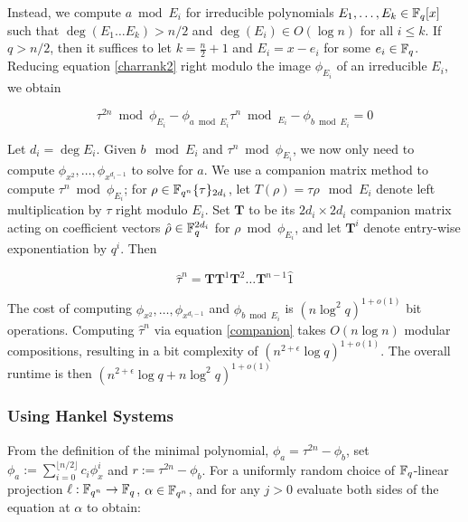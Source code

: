 Instead, we compute $a \bmod E_i$ for irreducible polynomials $E_1, \ldots, E_k \in \mathbb{F}_q[x]$ such that $\deg(E_1 \ldots E_k) > n/2$ and $\deg(E_i) \in O(\log n)$ for all $i \leq k$. If $q > n/2$, then it suffices to let $k = \frac{n}{2} + 1$ and $E_i = x - e_i$ for some $e_i \in \mathbb{F}_q$. Reducing equation \ref{charrank2} right modulo the image $\phi_{E_i}$ of an irreducible $E_i$, we obtain

\begin{equation}\label{modchar}
    \tau^{2n} \bmod \phi_{E_i} - \phi_{a \bmod E_i}\tau^n \bmod_{E_i} - \phi_{b \bmod E_i} = 0
\end{equation}

Let $d_i = \deg E_i$. Given $b \mod E_i$ and $\tau^n \bmod \phi_{E_i}$, we now only need to compute $\phi_{x^2}, \ldots, \phi_{x^{d_i -1}}$ to solve for $a$.  We use a companion matrix method to compute $\tau^n \bmod \phi_{E_i}$; for $\rho \in \mathbb{F}_{q^n}\{\tau\}_{2d_i}$, let $T(\rho) = \tau \rho \mod E_i$ denote left multiplication by $\tau$ right modulo $E_i$. Set $\mathbf{T}$ to be its $2d_i \times 2d_i$ companion matrix acting on coefficient vectors $\hat{\rho} \in \mathbb{F}_q^{2d_i} $ for $\rho \bmod \phi_{E_i}$, and let $\mathbf{T}^{i}$ denote entry-wise exponentiation by $q^i$. Then 

\begin{equation}\label{companion}
    \hat{\tau}^n = \mathbf{T}\mathbf{T}^{1} \mathbf{T}^{2} \ldots \mathbf{T}^{n-1}\hat{1}
\end{equation}

The cost of computing $\phi_{x^2}, \ldots, \phi_{x^{d_i -1}}$ and $\phi_{b \bmod E_i}$ is $(n\log^2q)^{1+o(1)}$ bit operations. Computing $\hat{\tau}^n$ via equation \ref{companion} takes $O(n\log n)$ modular compositions, resulting in a bit complexity of $(n^{2+\epsilon}\log q)^{1+o(1)}$. The overall runtime is then $(n^{2+\epsilon}\log q + n \log^2q)^{1+o(1)}$ 

\subsubsection{Using Hankel Systems}

From the definition of the minimal polynomial, $\phi_{a} = \tau^{2n} - \phi_{b}$, set $\phi_{a} := \sum_{i=0}^{\lfloor n/2 \rfloor} c_i\phi_{x}^i$ and $r := \tau^{2n} - \phi_{b}$. For a uniformly random choice of $\mathbb{F}_q$-linear projection $\ell : \mathbb{F}_{q^n} \to \mathbb{F}_q$, $\alpha \in \mathbb{F}_{q^n}$, and for any $j > 0$ evaluate both sides of the equation at $\alpha$ to obtain:


